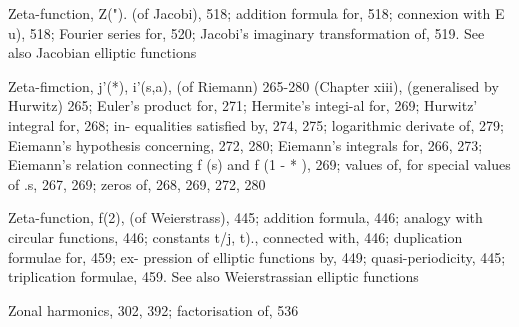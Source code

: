 Zeta-function, Z("). (of Jacobi), 518; addition formula for, 518; connexion with E u), 518;
Fourier series for, 520; Jacobi's imaginary transformation of, 519. See also Jacobian
elliptic functions

Zeta-fimction, j'(*), i'(s,a), (of Riemann) 265-280 (Chapter xiii), (generalised by Hurwitz) 265;
Euler's product for, 271; Hermite's integi-al for, 269; Hurwitz' integral for, 268; in-
equalities satisfied by, 274, 275; logarithmic derivate of, 279; Eiemann's hypothesis
concerning, 272, 280; Eiemann's integrals for, 266, 273; Eiemann's relation connecting f (s)
and f (1 - * ), 269; values of, for special values of .s, 267, 269; zeros of, 268, 269, 272, 280

Zeta-function, f(2), (of Weierstrass), 445; addition formula, 446; analogy with circular
functions, 446; constants t/j, t)., connected with, 446; duplication formulae for, 459; ex-
pression of elliptic functions by, 449; quasi-periodicity, 445; triplication formulae, 459.
See also Weierstrassian elliptic functions

Zonal harmonics, 302, 392; factorisation of, 536